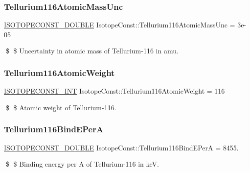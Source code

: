\subsubsection{\texorpdfstring{Tellurium116\+Atomic\+Mass\+Unc}{Tellurium116AtomicMassUnc}}
{\footnotesize\ttfamily \mbox{\hyperlink{group___isotope_const-_macros_ga8f45a7272ce02c0b4c65c44636ed719a}{I\+S\+O\+T\+O\+P\+E\+C\+O\+N\+S\+T\+\_\+\+D\+O\+U\+B\+LE}} Isotope\+Const\+::\+Tellurium116\+Atomic\+Mass\+Unc = 3e-\/05}

\$ \$ Uncertainty in atomic mass of Tellurium-\/116 in amu. \mbox{\label{group___isotope_const-_tellurium-_te116_ga267ecf87dae9347de737e77dc8c58c52}} 
\subsubsection{\texorpdfstring{Tellurium116\+Atomic\+Weight}{Tellurium116AtomicWeight}}
{\footnotesize\ttfamily \mbox{\hyperlink{group___isotope_const-_macros_ga5f18360b3e99483a35c32d789e62621c}{I\+S\+O\+T\+O\+P\+E\+C\+O\+N\+S\+T\+\_\+\+I\+NT}} Isotope\+Const\+::\+Tellurium116\+Atomic\+Weight = 116}

\$ \$ Atomic weight of Tellurium-\/116. \mbox{\label{group___isotope_const-_tellurium-_te116_gadfef519a577385ed749c9f489165b9a3}} 
\subsubsection{\texorpdfstring{Tellurium116\+Bind\+E\+PerA}{Tellurium116BindEPerA}}
{\footnotesize\ttfamily \mbox{\hyperlink{group___isotope_const-_macros_ga8f45a7272ce02c0b4c65c44636ed719a}{I\+S\+O\+T\+O\+P\+E\+C\+O\+N\+S\+T\+\_\+\+D\+O\+U\+B\+LE}} Isotope\+Const\+::\+Tellurium116\+Bind\+E\+PerA = 8455.}

\$ \$ Binding energy per A of Tellurium-\/116 in keV. \mbox{\label{group___isotope_const-_tellurium-_te116_ga5830fbd6720861aa213488d361143740}} 
